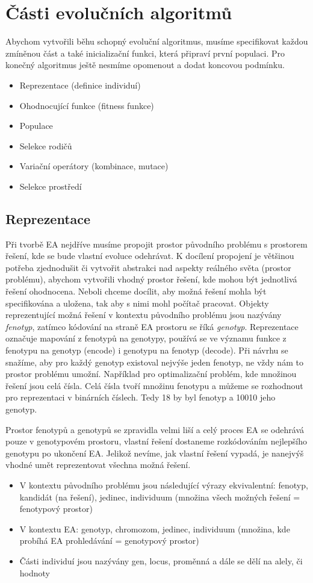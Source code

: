 \section{Části evolučních algoritmů}
Abychom vytvořili běhu schopný evoluční algoritmus, musíme specifikovat každou zmíněnou část a také inicializační funkci, která připraví první populaci. Pro konečný algoritmus ještě nesmíme opomenout a dodat koncovou podmínku. 
\begin{itemize}
\item{Reprezentace (definice individuí)}
\item{Ohodnocující funkce (fitness funkce)}
\item{Populace}
\item{Selekce rodičů}
\item{Variační operátory (kombinace, mutace)}
\item{Selekce prostředí}
\end{itemize}
\subsection*{Reprezentace}
Při tvorbě EA nejdříve musíme propojit prostor původního problému s prostorem řešení, kde se bude vlastní evoluce odehrávat. K docílení propojení je většinou potřeba zjednodušit či vytvořit abstrakci nad aspekty reálného světa (prostor problému), abychom vytvořili vhodný prostor řešení, kde mohou být jednotlivá řešení ohodnocena. Neboli chceme docílit, aby možná řešení mohla být specifikována a uložena, tak aby s nimi mohl počítač pracovat. Objekty reprezentující možná řešení v kontextu původního problému jsou nazývány \textit{fenotyp}, zatímco kódování na straně EA prostoru se říká \textit{genotyp}. Reprezentace označuje mapování z fenotypů na genotypy, používá se ve významu funkce z fenotypu na genotyp (encode) i genotypu na fenotyp (decode).  Při návrhu se snažíme, aby pro každý genotyp existoval nejvýše jeden fenotyp, ne vždy nám to prostor problému umožní. Například pro optimalizační problém, kde množinou řešení jsou celá čísla. Celá čísla tvoří množinu fenotypu a můžeme se rozhodnout pro reprezentaci v binárních číslech. Tedy 18 by byl fenotyp a 10010 jeho genotyp. 
\par
Prostor fenotypů a genotypů se zpravidla velmi liší a celý proces EA se odehrává pouze v genotypovém prostoru, vlastní řešení dostaneme rozkódováním nejlepšího genotypu po ukončení EA. Jelikož nevíme, jak vlastní řešení vypadá, je nanejvýš vhodné umět reprezentovat všechna možná řešení.
\begin{itemize}   
  \item V kontextu původního problému jsou následující výrazy ekvivalentní: fenotyp, kandidát (na řešení), jedinec, individuum (množina všech možných řešení = fenotypový prostor)
  \item V kontextu EA: genotyp, chromozom, jedinec, individuum (množina, kde probíhá EA prohledávání = genotypový prostor)
  \item Části individuí jsou nazývány gen, locus, proměnná a dále se dělí na alely, či hodnoty
  \end{itemize}
